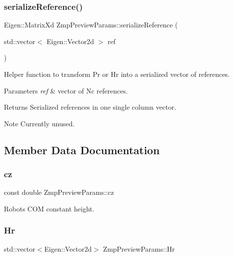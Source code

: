 \subsubsection{\texorpdfstring{serialize\+Reference()}{serializeReference()}}
{\footnotesize\ttfamily Eigen\+::\+Matrix\+Xd Zmp\+Preview\+Params\+::serialize\+Reference (\begin{DoxyParamCaption}\item[{std\+::vector$<$ Eigen\+::\+Vector2d $>$}]{ref }\end{DoxyParamCaption})\hspace{0.3cm}{\ttfamily [inline]}}

Helper function to transform Pr or Hr into a serialized vector of references.


\begin{DoxyParams}{Parameters}
{\em ref} & vector of Nc references. \\
\hline
\end{DoxyParams}
\begin{DoxyReturn}{Returns}
Serialized references in one single column vector. 
\end{DoxyReturn}
\begin{DoxyNote}{Note}
Currently unused. 
\end{DoxyNote}


\subsection{Member Data Documentation}
\hypertarget{structZmpPreviewParams_a19d944dc7a6b40e6e55068a62d33e546}{}\label{structZmpPreviewParams_a19d944dc7a6b40e6e55068a62d33e546} 
\subsubsection{\texorpdfstring{cz}{cz}}
{\footnotesize\ttfamily const double Zmp\+Preview\+Params\+::cz}

Robot\textquotesingle{}s C\+OM constant height. \hypertarget{structZmpPreviewParams_a5dc49bed0a434fd99f74517185792456}{}\label{structZmpPreviewParams_a5dc49bed0a434fd99f74517185792456} 
\subsubsection{\texorpdfstring{Hr}{Hr}}
{\footnotesize\ttfamily std\+::vector$<$Eigen\+::\+Vector2d$>$ Zmp\+Preview\+Params\+::\+Hr}

